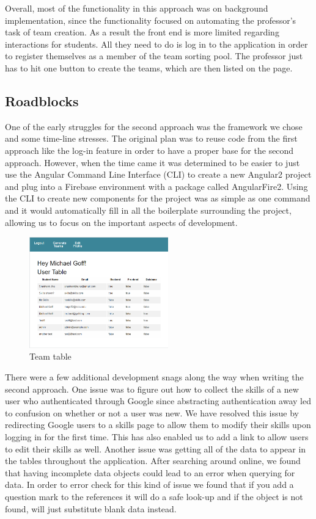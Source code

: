 \documentclass[conference]{IEEEtran}
\begin{document}
Overall, most of the functionality in this approach was on background implementation, since the functionality focused on automating the professor's task of team creation. As a result the front end is more limited regarding interactions for students. All they need to do is log in to the application in order to register themselves as a member of the team sorting pool. The professor just has to hit one button to create the teams, which are then listed on the page.

\subsection{Roadblocks}

One of the early struggles for the second approach was the framework we chose and some time-line stresses. The original plan was to reuse code from the first approach like the log-in feature in order to have a proper base for the second approach. However, when the time came it was determined to be easier to just use the Angular Command Line Interface (CLI) to create a new Angular2 project and plug into a Firebase environment with a package called AngularFire2. Using the CLI to create new components for the project was as simple as one command and it would automatically fill in all the boilerplate surrounding the project, allowing us to focus on the important aspects of development. 

\begin{figure}[H]
  \centering
  \includegraphics[width=6cm]{image/home.PNG}
  \caption{Team table}
  \label{home}
\end{figure}

There were a few additional development snags along the way when writing the second approach. One issue was to figure out how to collect the skills of a new user who authenticated through Google since abstracting authentication away led to confusion on whether or not a user was new. We have resolved this issue by redirecting Google users to a skills page to allow them to modify their skills upon logging in for the first time. This has also enabled us to add a link to allow users to edit their skills as well. Another issue was getting all of the data to appear in the tables throughout the application. After searching around online, we found that having incomplete data objects could lead to an error when querying for data. In order to error check for this kind of issue we found that if you add a question mark to the references it will do a safe look-up and if the object is not found, will just substitute blank data instead. 
\end{document}
